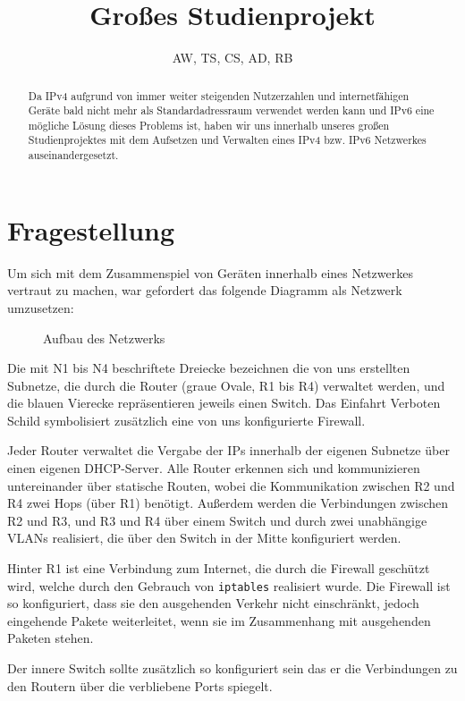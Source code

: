 \documentclass[10pt,a4paper]{article}
\author{AW, TS, CS, AD, RB}
\title{Großes Studienprojekt}
\begin{document}
\maketitle
\begin{abstract}
  Da IPv4 aufgrund von immer weiter steigenden Nutzerzahlen
  und internetfähigen Geräte bald nicht mehr als
  Standardadressraum verwendet werden kann und IPv6 eine
  mögliche Lösung dieses Problems ist, haben wir uns innerhalb
  unseres großen Studienprojektes mit dem Aufsetzen und
  Verwalten eines IPv4 bzw. IPv6 Netzwerkes
  auseinandergesetzt.
\end{abstract}
\section{Fragestellung}
Um sich mit dem Zusammenspiel von Geräten innerhalb eines
Netzwerkes vertraut zu machen, war gefordert das folgende
Diagramm als Netzwerk umzusetzen:
\begin{figure}[ht]
  \centering
  \caption{Aufbau des Netzwerks}
\end{figure}
\par
Die mit N1 bis N4 beschriftete Dreiecke bezeichnen die von uns
erstellten Subnetze, die durch die Router (graue Ovale, R1 bis R4)
verwaltet werden, und die blauen Vierecke repräsentieren jeweils einen
Switch. Das \glqq Einfahrt Verboten\grqq~ Schild symbolisiert
zusätzlich eine von uns konfigurierte Firewall.
\par
Jeder Router verwaltet die Vergabe der IPs innerhalb der eigenen
Subnetze über einen eigenen DHCP-Server. Alle Router erkennen sich und
kommunizieren untereinander über statische Routen, wobei die
Kommunikation zwischen R2 und R4 zwei Hops (über R1) benötigt.
Außerdem werden die Verbindungen zwischen R2 und R3, und R3 und R4
über einem Switch und durch zwei unabhängige VLANs realisiert, die
über den Switch in der Mitte konfiguriert werden.
\par
Hinter R1 ist eine Verbindung zum Internet, die durch die Firewall
geschützt wird, welche durch den Gebrauch von \texttt{iptables}
realisiert wurde. Die Firewall ist so konfiguriert, dass sie den
ausgehenden Verkehr nicht einschränkt, jedoch eingehende Pakete
weiterleitet, wenn sie im Zusammenhang mit ausgehenden Paketen stehen.
\par
Der innere Switch sollte zusätzlich so konfiguriert sein das er die
Verbindungen zu den Routern über die verbliebene Ports spiegelt.
\end{document}
